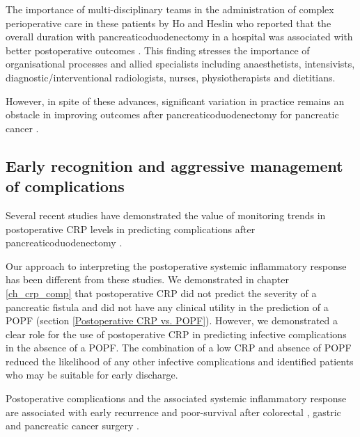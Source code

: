 The importance of multi-disciplinary teams in the administration of complex perioperative care in these patients by Ho and Heslin who reported that the overall duration with pancreaticoduodenectomy in a hospital was associated with better postoperative outcomes \parencite{ho_effect_2003}.
This finding stresses the importance of organisational processes and allied specialists including anaesthetists, intensivists, diagnostic/interventional radiologists, nurses, physiotherapists and dietitians.

However, in spite of these advances, significant variation in practice remains an obstacle in improving outcomes after pancreaticoduodenectomy for pancreatic cancer \parencite{cyr_canadian_2015}.

\subsection{Early recognition and aggressive management of complications}

Several recent studies have demonstrated the value of monitoring trends in postoperative CRP levels in predicting complications after pancreaticoduodenectomy \parencite{hiyoshi_usefulness_2013, ansorge_diagnostic_2014, kosaka_multivariate_2014}.

Our approach to interpreting the postoperative systemic inflammatory response has been different from these studies. 
We demonstrated in chapter \ref{ch_crp_comp} that postoperative CRP did not predict the severity of a pancreatic fistula and did not have any clinical utility in the prediction of a POPF (section \ref{Postoperative CRP vs. POPF}).
However, we demonstrated a clear role for the use of postoperative CRP in predicting infective complications in the absence of a POPF. 
The combination of a low CRP and absence of POPF reduced the likelihood of any other infective complications and identified patients who may be suitable for early discharge.

Postoperative complications and the associated systemic inflammatory response are associated with early recurrence and poor-survival after colorectal \parencite{artinyan_infectious_2015, mcardle_impact_2005}, gastric \parencite{hayashi_impact_2015,kubota_prognostic_2014}  and pancreatic cancer surgery \parencite{aoyama_impact_2015, kamphues_postoperative_2012}.

